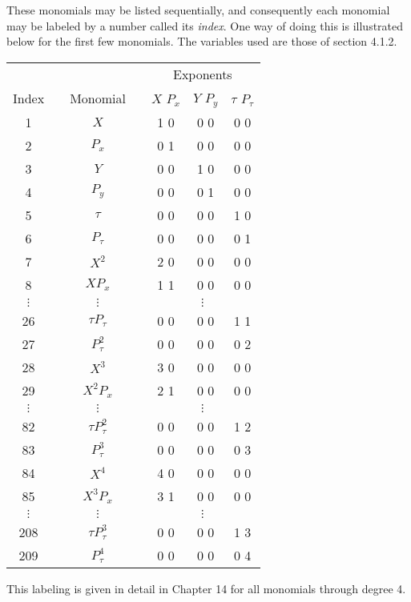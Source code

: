      These monomials may be listed sequentially, and consequently each
monomial may be labeled by a number called its {\em index}.   One way of doing
this is illustrated below for the first few monomials.  The variables used
are those of section 4.1.2.
\begin{center}
\begin{tabular}{ccccccc}
\multicolumn{4}{c}{ } &
\multicolumn{3}{c}{Exponents} \\
    Index   & &     Monomial  & &  $X$  $P_x$ &  $Y$  $P_y$ & $\tau$  $P_{\tau}$ \\ \cline{1-1} \cline{3-3} \cline{5-7}
      1     & &         $X$     & &  1  0 & 0  0 & 0  0 \\
      2     & &        $P_x$  & &  0  1 & 0  0 & 0  0 \\
      3     & &         $Y$     & &  0  0 & 1  0 & 0  0 \\
      4     & &        $P_y$  & &  0  0 & 0  1 & 0  0 \\
      5     & &        $\tau$   & &  0  0 & 0  0 & 1  0 \\
      6     & &      $P_{\tau}$ & &  0  0 & 0  0 & 0  1 \\
      7     & &        $X^2$  & &  2  0 & 0  0 & 0  0 \\
      8     & &       $XP_x$  & &  1  1 & 0  0 & 0  0 \\
\multicolumn{1}{c}{$\vdots$} &
\multicolumn{1}{c}{ } &
\multicolumn{1}{c}{$\vdots$} &
\multicolumn{1}{c}{ } &
\multicolumn{3}{c}{$\vdots$} \\
     26     & & $\tau P_{\tau}$ & &  0  0 & 0  0 & 1  1 \\
     27     & &  $P_{\tau}^2$ & &  0  0 & 0  0 & 0  2 \\
     28     & &      $X^3$    & &  3  0 & 0  0 & 0  0 \\
     29     & &   $X^2 P_x$ & &  2  1 & 0  0 & 0  0 \\
\multicolumn{1}{c}{$\vdots$} &
\multicolumn{1}{c}{ } &
\multicolumn{1}{c}{$\vdots$} &
\multicolumn{1}{c}{ } &
\multicolumn{3}{c}{$\vdots$} \\
     82     & & $\tau P_{\tau}^2$ & &  0  0 & 0  0 & 1  2 \\
     83     & &    $P_{\tau}^3$   & &  0  0 & 0  0 & 0  3 \\
     84     & &       $X^4$       & &  4  0 & 0  0 & 0  0 \\
     85     & &    $X^3 P_x$    & &  3  1 & 0  0 & 0  0 \\
\multicolumn{1}{c}{$\vdots$} &
\multicolumn{1}{c}{ } &
\multicolumn{1}{c}{$\vdots$} &
\multicolumn{1}{c}{ } &
\multicolumn{3}{c}{$\vdots$} \\
     208    & & $\tau P_{\tau}^3$ & &  0  0 & 0  0 & 1  3 \\
     209    & &    $P_{\tau}^4$   & &  0  0 & 0  0 & 0  4
\end{tabular}
\end{center}
This labeling is given in detail in Chapter 14 for all monomials through
degree 4.

